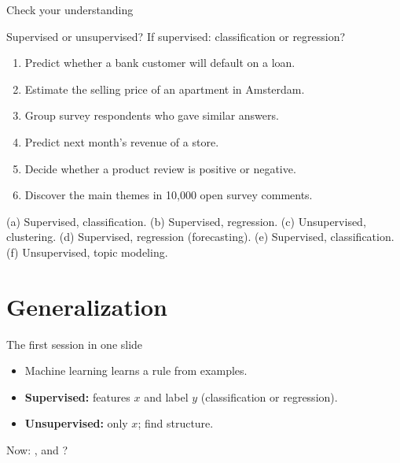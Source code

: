 \documentclass[handout,aspectratio=169,t,9pt]{beamer}
\begin{document}
\begin{frame}{Check your understanding}
  \begin{exercise}
    Supervised or unsupervised?  If supervised: classification or
    regression?
    \begin{enumerate}[label=(\alph*),itemsep=1pt,topsep=3pt]
      \item Predict whether a bank customer will default on a loan.
      \item Estimate the selling price of an apartment in Amsterdam.
      \item Group survey respondents who gave similar answers.
      \item Predict next month's revenue of a store.
      \item Decide whether a product review is positive or negative.
      \item Discover the main themes in 10{,}000 open survey comments.
    \end{enumerate}
  \end{exercise}

  \begin{solution}
    (a) Supervised, classification.
    (b) Supervised, regression.
    (c) Unsupervised, clustering.
    (d) Supervised, regression (forecasting).
    (e) Supervised, classification.
    (f) Unsupervised, topic modeling.
  \end{solution}

\end{frame}

\section{Generalization}

\begin{frame}{The first session in one slide}
  \vspace{0.3cm}
  \begin{recap}
    \begin{itemize}
      \item Machine learning learns a rule from examples.
      \item \textbf{Supervised:} features $x$ and label $y$
            (classification or regression).
      \item \textbf{Unsupervised:} only $x$; find structure.
    \end{itemize}
  \end{recap}

  \vspace{0.6cm}
  Now: , and ?
\end{frame}
\end{document}
